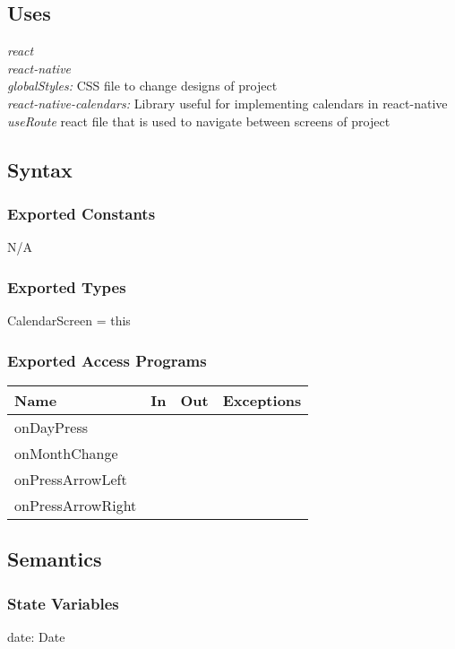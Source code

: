 \documentclass[12pt, titlepage]{article}
\begin{document}
\subsection{Uses}
{\textit{react}}\\
{\textit{react-native}}\\
{\textit{globalStyles:} CSS file to change designs of project}\\
{\textit{react-native-calendars:} Library useful for implementing calendars in react-native}\\
{\textit{useRoute} react file that is used to navigate between screens of project}\\

\subsection{Syntax}

\subsubsection{Exported Constants}
N/A

\subsubsection{Exported Types}
CalendarScreen = this

\subsubsection{Exported Access Programs}

\begin{tabular}{| l | l | l | l |}
	\hline
	{\textbf{Name}} & {\textbf{In}} & {\textbf{Out}} & {\textbf{Exceptions}}\\
	\hline
	{onDayPress} & & & \\
	\hline
	{onMonthChange} & & & \\
	\hline
	{onPressArrowLeft} & & & \\
	\hline
	{onPressArrowRight} & & & \\
	\hline
\end{tabular}

\subsection{Semantics}

\subsubsection{State Variables}
date: Date
\end{document}
